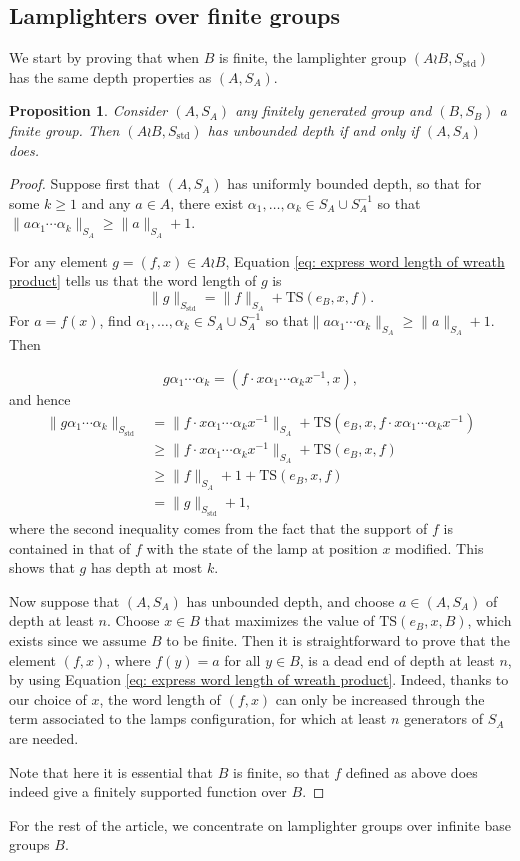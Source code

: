 \documentclass[reqno,oneside]{amsart}
\newcommand{\std}{S_{\mathrm{std}}}
\newcommand{\TS}[3]{\mathrm{TS}\left(#1,#2,#3\right)}
\theoremstyle{plain}
\newtheorem{prop}[thm]{Proposition}
\theoremstyle{definition}
\begin{document}
\subsection{Lamplighters over finite groups}
We start by proving that when $B$ is finite, the lamplighter group $(A\wr B,\std)$ has the same depth properties as $(A,S_A)$. 
\begin{prop}\label{prop: lamplighter over finite group deep dead ends if and only if lamps have deep dead ends} Consider $(A,S_A)$ any finitely generated group and $(B,S_B)$ a finite group. Then $(A\wr B,\std)$ has unbounded depth if and only if $(A,S_A)$ does. 
\end{prop}
\begin{proof}
	
	Suppose first that $(A,S_A)$ has uniformly bounded depth, so that for some $k\ge 1$ and any $a\in A$, there exist $\alpha_1,\ldots,\alpha_k\in S_A\cup S_A^{-1}$ so that $\|a\alpha_1\cdots\alpha_k\|_{S_A}\ge \|a\|_{S_A}+1$.
	
	For any element $g=(f,x)\in A\wr B$, Equation \eqref{eq: express word length of wreath product} tells us that the word length of $g$ is
	$$
	\|g\|_{\std}=\|f\|_{S_A}+\TS{e_B}{x}{f}.
	$$
	For $a=f(x)$, find $\alpha_1,\ldots,\alpha_k\in S_A\cup S_A^{-1}$ so that$\|a\alpha_1\cdots\alpha_k\|_{S_A}\ge \|a\|_{S_A}+1$. Then
	
	$$
	g\alpha_1\cdots\alpha_k=(f\cdot x\alpha_1\cdots\alpha_kx^{-1},x),
	$$
	and hence
	\begin{align*}
	\|g\alpha_1\cdots\alpha_k\|_{\std}&=\|f\cdot x\alpha_1\cdots\alpha_kx^{-1}\|_{S_A}+\TS{e_B}{x}{f\cdot x\alpha_1\cdots\alpha_kx^{-1}}\\
	&\ge\|f\cdot x\alpha_1\cdots\alpha_kx^{-1}\|_{S_A}+\TS{e_B}{x}{f}\\
	&\ge \|f\|_{S_A}+1+\TS{e_B}{x}{f} \\
	&=\|g\|_{\std}+1,	
	\end{align*}
	where the second inequality comes from the fact that the support of $f$ is contained in that of $f$ with the state of the lamp at position $x$ modified. This shows that $g$ has depth at most $k$.
	
	Now suppose that $(A,S_A)$ has unbounded depth, and choose $a\in (A,S_A)$ of depth  at least $n$. Choose $x\in B$ that maximizes the value of $\TS{e_B}{x}{B}$, which exists since we assume $B$ to be finite. Then it is straightforward to prove that the element $(f,x)$, where $f(y)=a$ for all $y\in B$, is a dead end of depth at least $n$, by using Equation \eqref{eq: express word length of wreath product}. Indeed, thanks to our choice of $x$, the word length of $(f,x)$ can only be increased through the term associated to the lamps configuration, for which at least $n$ generators of $S_A$ are needed.
	
	
	Note that here it is essential that $B$ is finite, so that $f$ defined as above does indeed give a finitely supported function over $B$.
\end{proof}
For the rest of the article, we concentrate on lamplighter groups over infinite base groups $B$.
\end{document}
